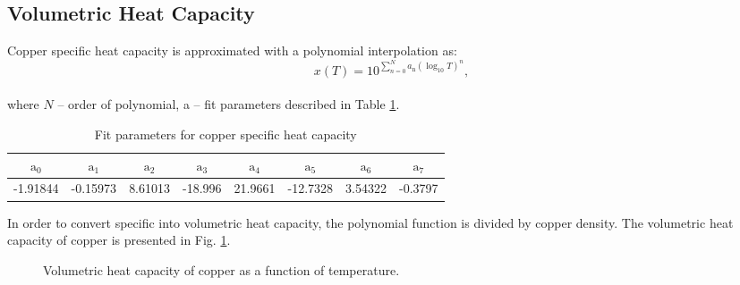 \subsection{Volumetric Heat Capacity}
Copper specific heat capacity is approximated with a polynomial interpolation as: 
\begin{equation}
    x(T) = 10^{\sum_{n=0}^{N} a_\text{n}(\log_\text{10}T)^{n}},
\end{equation}
\\
where $N$ -- order of polynomial, a -- fit parameters described in Table \ref{table:nist_cu_cp_parameters}. 

\begin{table}[H]
    \caption{Fit parameters for copper specific heat capacity} 
    \vspace{-1.em} 
    \fontsize{10}{10}
    \selectfont 
    \renewcommand{\arraystretch}{1.5}
    \begin{center}
    \begin{tabular}{ cccccccc }  
    $\text{a}_0$ & $\text{a}_1$ & $\text{a}_2$ & $\text{a}_3$ & $\text{a}_4$ & $\text{a}_5$ & $\text{a}_6$ & $\text{a}_7$ \\
    \hline
    -1.91844 & -0.15973 & 8.61013 & -18.996 & 21.9661 & -12.7328 & 3.54322 & -0.3797 \\
    \hline 
    \end{tabular}
    \end{center}  
     \label{table:nist_cu_cp_parameters} 
 \end{table}
 
In order to convert specific into volumetric heat capacity, the polynomial function is divided by copper density. The volumetric heat capacity of copper is presented in Fig. \ref{fig:cu_cv_plot}.

\begin{figure}[H]
\centering
{}
    \caption{Volumetric heat capacity of copper as a function of temperature.}
    \label{fig:cu_cv_plot}
\end{figure}

